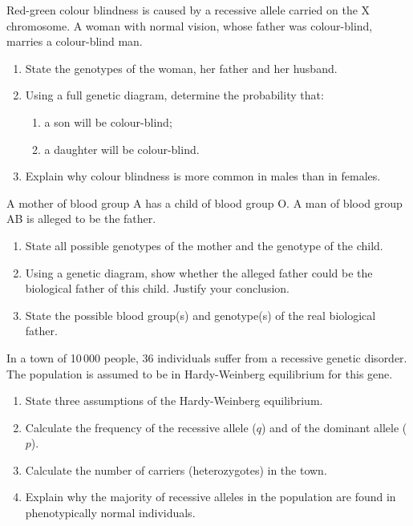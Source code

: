 \documentclass[11pt]{article}
\begin{document}
\begin{exercice}
Red-green colour blindness is caused by a recessive allele carried on the X chromosome. A woman with normal vision, whose father was colour-blind, marries a colour-blind man.
\begin{enumerate}
\item State the genotypes of the woman, her father and her husband.
\item Using a full genetic diagram, determine the probability that:
\begin{enumerate}
\item a son will be colour-blind;
\item a daughter will be colour-blind.
\end{enumerate}
\item Explain why colour blindness is more common in males than in females.
\end{enumerate}
\end{exercice}

\begin{exercice}
A mother of blood group A has a child of blood group O. A man of blood group AB is alleged to be the father.
\begin{enumerate}
\item State all possible genotypes of the mother and the genotype of the child.
\item Using a genetic diagram, show whether the alleged father could be the biological father of this child. Justify your conclusion.
\item State the possible blood group(s) and genotype(s) of the real biological father.
\end{enumerate}
\end{exercice}

\begin{exercice}
In a town of 10\,000 people, 36 individuals suffer from a recessive genetic disorder. The population is assumed to be in Hardy-Weinberg equilibrium for this gene.
\begin{enumerate}
\item State three assumptions of the Hardy-Weinberg equilibrium.
\item Calculate the frequency of the recessive allele ($q$) and of the dominant allele ($p$).
\item Calculate the number of carriers (heterozygotes) in the town.
\item Explain why the majority of recessive alleles in the population are found in phenotypically normal individuals.
\end{enumerate}
\end{exercice}
\end{document}
